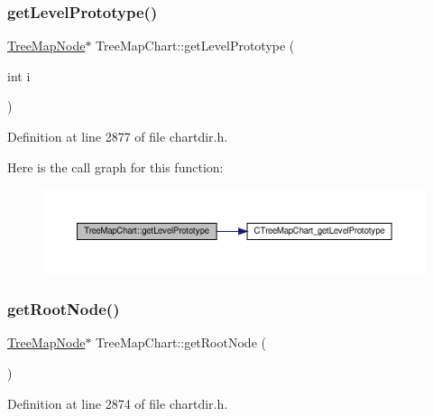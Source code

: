 \subsubsection{\texorpdfstring{get\+Level\+Prototype()}{getLevelPrototype()}}
{\footnotesize\ttfamily \hyperlink{class_tree_map_node}{Tree\+Map\+Node}$\ast$ Tree\+Map\+Chart\+::get\+Level\+Prototype (\begin{DoxyParamCaption}\item[{int}]{i }\end{DoxyParamCaption})\hspace{0.3cm}{\ttfamily [inline]}}



Definition at line 2877 of file chartdir.\+h.

Here is the call graph for this function\+:
\nopagebreak
\begin{figure}[H]
\begin{center}
\leavevmode
\includegraphics[width=350pt]{class_tree_map_chart_a6a8f50c363473cd412a4b8b8e2b40cef_cgraph}
\end{center}
\end{figure}
\mbox{\label{class_tree_map_chart_a75161aecc888f38bd2f12ac69f380a4a}} 
\subsubsection{\texorpdfstring{get\+Root\+Node()}{getRootNode()}}
{\footnotesize\ttfamily \hyperlink{class_tree_map_node}{Tree\+Map\+Node}$\ast$ Tree\+Map\+Chart\+::get\+Root\+Node (\begin{DoxyParamCaption}{ }\end{DoxyParamCaption})\hspace{0.3cm}{\ttfamily [inline]}}



Definition at line 2874 of file chartdir.\+h.

